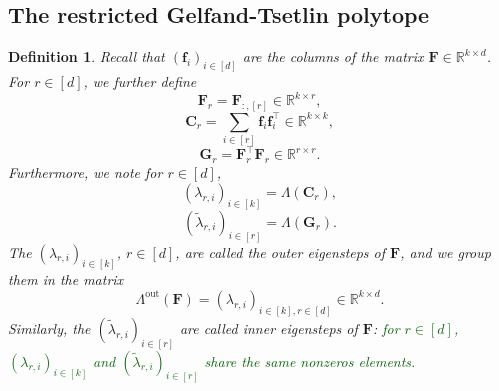 \documentclass[twoside,11pt]{book}
\newcommand{\rev}[1]{\textcolor{darkgreen}{#1}}
\newtheorem{definition}{Definition}
\numberwithin{theorem}{chapter}
\numberwithin{definition}{chapter}
\numberwithin{proposition}{chapter}
\numberwithin{corollary}{chapter}
\numberwithin{example}{chapter}
\numberwithin{lemma}{chapter}
\DeclareMathOperator{\Tran}{\intercal}
\begin{document}
\subsection{The restricted Gelfand-Tsetlin polytope}
\label{s:gt}
\begin{definition}
Recall that $(\bm{f}_{i})_{i \in [d]}$ are the columns of the matrix $\bm{F}\in\mathbb{R}^{k\times d}$. For $r \in [d]$, we further define
\begin{equation}
\bm{F}_{r} = \bm{F}_{:,[r]} \in \mathbb{R}^{k \times r},
\end{equation}
\begin{equation}
\bm{C}_{r} = \sum\limits_{i \in [r]} \bm{f}_{i}\bm{f}_{i}^{\Tran} \in \mathbb{R}^{k \times k},
\end{equation}
\begin{equation}
\bm{G}_{r} = \bm{F}_{r}^{\Tran}\bm{F}_{r} \in \mathbb{R}^{r \times r}.
\end{equation}
Furthermore, we note for $r \in [d]$,
\begin{equation}
    (\lambda_{r,i})_{i \in [k]} = \Lambda(\bm{C}_{r}),
\end{equation}
\begin{equation}
    (\tilde{\lambda}_{r,i})_{i \in [r]} = \Lambda(\bm{G}_{r}).
\end{equation}
The $(\lambda_{r,i})_{i \in [k]}$, $r\in [d]$, are called the outer eigensteps of $\bm{F}$, and we group them in the matrix $$\Lambda^{\text{out}}(\bm{F}) = (\lambda_{r,i})_{i \in [k],r \in [d]} \in \mathbb{R}^{k \times d}.$$ Similarly, the $(\tilde{\lambda}_{r,i})_{i \in [r]}$ are called inner eigensteps of $\bm{F}$: \rev{for $r \in [d]$, $(\lambda_{r,i})_{i \in [k]}$ and $(\tilde{\lambda}_{r,i})_{i \in [r]}$ share the same nonzeros elements.}
\end{definition}
\end{document}

